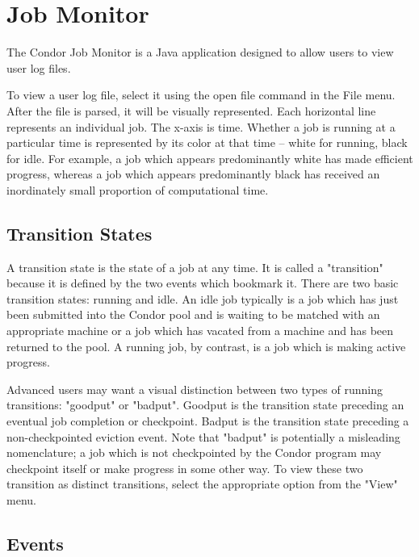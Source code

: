 
\section{Job Monitor}

The Condor Job Monitor is a Java application designed to allow users to view user log files. 

To view a user log file, select it using the open file command in the File menu.  After the file is parsed, it will be visually represented.  Each horizontal line represents an individual job.  The x-axis
is time.  Whether a job is running at a particular time is represented by its color at that time -- white for running, black for idle.  For example, a job which appears predominantly white has made
efficient progress, whereas a job which appears predominantly black has received an inordinately small proportion of computational time. 


\subsection{\label{sec:transition-states}Transition States}

A transition state is the state of a job at any time.  It is called a "transition" because it is defined by the two events which bookmark it.  There are two basic transition states: running and idle. 
An idle job typically is a job which has just been submitted into the Condor pool and is waiting to be matched with an appropriate machine or a job which has vacated from a machine and has been
returned to the pool.  A running job, by contrast, is a job which is making active progress. 

Advanced users may want a visual distinction between two types of running transitions: "goodput" or "badput".  Goodput is the transition state preceding an eventual job completion or
checkpoint.  Badput is the transition state preceding a non-checkpointed eviction event.  Note that "badput" is potentially a misleading nomenclature; a job which is not checkpointed by the
Condor program may checkpoint itself or make progress in some other way.  To view these two transition as distinct transitions, select the appropriate option from the "View" menu. 


\subsection{\label{sec:events}Events}

